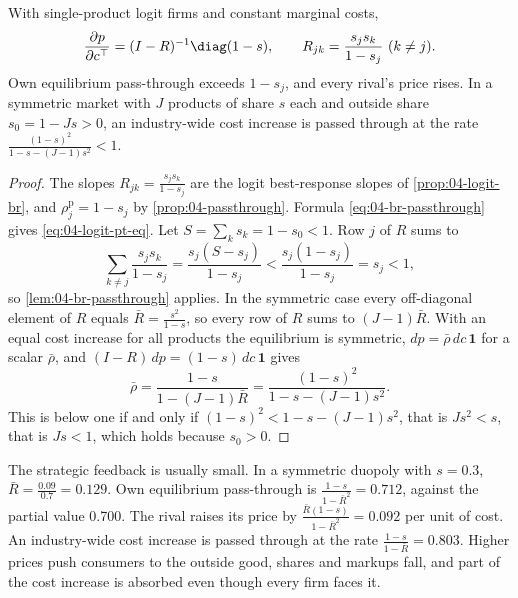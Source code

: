 \begin{corollary}\label{cor:04-passthrough-eq}
With single-product logit firms and constant marginal costs,
\begin{equation}\label{eq:04-logit-pt-eq}
\frac{\partial p}{\partial c^\top} = (I - R)^{-1}\diag(1 - s),
\qquad R_{jk} = \frac{s_j s_k}{1 - s_j}\ (k \neq j).
\end{equation}
Own equilibrium pass-through exceeds $1 - s_j$, and every rival's price rises. In a symmetric market with $J$
products of share $s$ each and outside share $s_0 = 1 - Js > 0$, an industry-wide cost increase is passed through
at the rate $\frac{(1 - s)^2}{1 - s - (J - 1)s^2} < 1$.
\end{corollary}

\begin{proof}
The slopes $R_{jk} = \frac{s_j s_k}{1 - s_j}$ are the logit best-response slopes of \cref{prop:04-logit-br}, and
$\rho^{\mathrm{p}}_j = 1 - s_j$ by \cref{prop:04-passthrough}. Formula \eqref{eq:04-br-passthrough} gives
\eqref{eq:04-logit-pt-eq}. Let $S = \sum_k s_k = 1 - s_0 < 1$. Row $j$ of $R$ sums to
\begin{equation*}
\sum_{k \neq j}\frac{s_j s_k}{1 - s_j} = \frac{s_j(S - s_j)}{1 - s_j} < \frac{s_j(1 - s_j)}{1 - s_j} = s_j < 1,
\end{equation*}
so \cref{lem:04-br-passthrough} applies. In the symmetric case every off-diagonal element of $R$ equals $\bar R =
\frac{s^2}{1 - s}$, so every row of $R$ sums to $(J - 1)\bar R$. With an equal cost increase for all products the
equilibrium is symmetric, $dp = \bar\rho\,dc\,\mathbf{1}$ for a scalar $\bar\rho$, and $(I - R)\,dp = (1 -
s)\,dc\,\mathbf{1}$ gives
\begin{equation*}
\bar\rho = \frac{1 - s}{1 - (J - 1)\bar R} = \frac{(1 - s)^2}{1 - s - (J - 1)s^2} .
\end{equation*}
This is below one if and only if $(1 - s)^2 < 1 - s - (J - 1)s^2$, that is $Js^2 < s$, that is $Js < 1$, which
holds because $s_0 > 0$.
\end{proof}

The strategic feedback is usually small. In a symmetric duopoly with $s = 0.3$, $\bar R = \frac{0.09}{0.7} = 0.129$.
Own equilibrium pass-through is $\frac{1 - s}{1 - \bar R^2} = 0.712$, against the partial value 0.700. The rival
raises its price by $\frac{\bar R(1 - s)}{1 - \bar R^2} = 0.092$ per unit of cost. An industry-wide cost increase is
passed through at the rate $\frac{1 - s}{1 - \bar R} = 0.803$. Higher prices push consumers to the outside good, shares and markups
fall, and part of the cost increase is absorbed even though every firm faces it.

